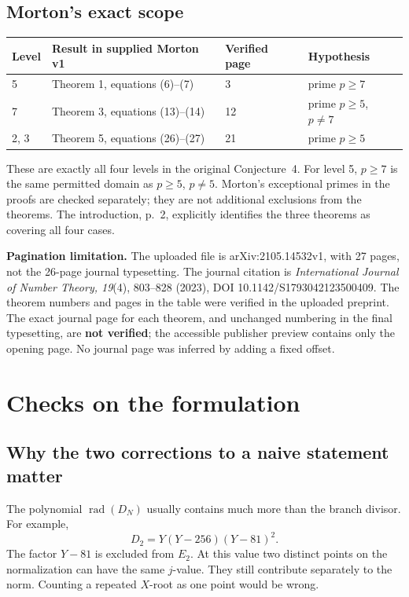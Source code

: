 \documentclass[11pt,a4paper]{article}
\begin{document}
\subsection{Morton's exact scope}
\begin{center}
\begin{tabular}{llll}
\toprule
Level & Result in supplied Morton v1 & Verified page & Hypothesis\\
\midrule
5 & Theorem 1, equations (6)--(7) & 3 & prime $p\ge7$\\
7 & Theorem 3, equations (13)--(14) & 12 & prime $p\ge5$, $p\ne7$\\
2, 3 & Theorem 5, equations (26)--(27) & 21 & prime $p\ge5$\\
\bottomrule
\end{tabular}
\end{center}
These are exactly all four levels in the original Conjecture~4. For level 5, $p\ge7$ is the same permitted domain as $p\ge5$, $p\ne5$. Morton's exceptional primes in the proofs are checked separately; they are not additional exclusions from the theorems. The introduction, p.~2, explicitly identifies the three theorems as covering all four cases.

\textbf{Pagination limitation.} The uploaded file is arXiv:2105.14532v1, with 27 pages, not the 26-page journal typesetting. The journal citation is \emph{International Journal of Number Theory, 19}(4), 803--828 (2023), DOI 10.1142/S1793042123500409. The theorem numbers and pages in the table were verified in the uploaded preprint. The exact journal page for each theorem, and unchanged numbering in the final typesetting, are \textbf{not verified}; the accessible publisher preview contains only the opening page. No journal page was inferred by adding a fixed offset.



\section{Checks on the formulation}
\subsection{Why the two corrections to a naive statement matter}
The polynomial $\operatorname{rad}(D_N)$ usually contains much more than the branch divisor. For example,
\[
 D_2=Y(Y-256)(Y-81)^2.
\]
The factor $Y-81$ is excluded from $E_2$. At this value two distinct points on the normalization can have the same $j$-value. They still contribute separately to the norm. Counting a repeated $X$-root as one point would be wrong.
\end{document}
